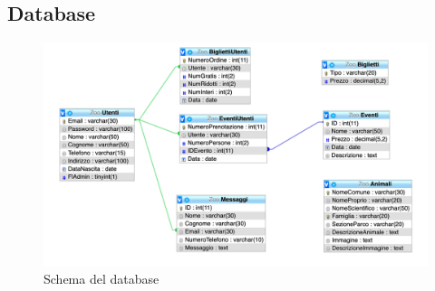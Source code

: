     \subsection{Database}

    \begin{figure}[H]
        \centering
        \includegraphics[width=15cm]{./img/database.png}
        \caption{Schema del database}  \label{fig:xray}
    \end{figure}
\pagebreak